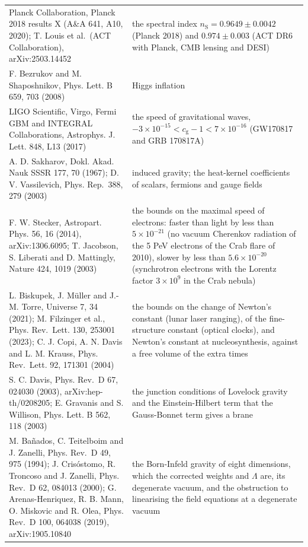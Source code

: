 \documentclass[
  10pt,
]{article}
\begin{document}
\begin{longtable}[]{@{}
  >{\raggedright\arraybackslash}p{}
  >{\raggedright\arraybackslash}p{}@{}}
Planck Collaboration, Planck 2018 results X (A\&A 641, A10, 2020); T.
Louis et al.~(ACT Collaboration), arXiv:2503.14452 & the spectral index
\(n_{\mathrm{S}} = 0.9649 \pm 0.0042\) (Planck 2018) and
\(0.974 \pm 0.003\) (ACT DR6 with Planck, CMB lensing and DESI) \\
F. Bezrukov and M. Shaposhnikov, Phys. Lett. B 659, 703 (2008) & Higgs
inflation \\
LIGO Scientific, Virgo, Fermi GBM and INTEGRAL Collaborations,
Astrophys. J. Lett. 848, L13 (2017) & the speed of gravitational waves,
\(-3\times10^{-15} < c_{\mathrm{g}} - 1 < 7\times10^{-16}\) (GW170817
and GRB 170817A) \\
A. D. Sakharov, Dokl. Akad. Nauk SSSR 177, 70 (1967); D. V. Vassilevich,
Phys. Rep.~388, 279 (2003) & induced gravity; the heat-kernel
coefficients of scalars, fermions and gauge fields \\
F. W. Stecker, Astropart. Phys. 56, 16 (2014), arXiv:1306.6095; T.
Jacobson, S. Liberati and D. Mattingly, Nature 424, 1019 (2003) & the
bounds on the maximal speed of electrons: faster than light by less than
\(5\times10^{-21}\) (no vacuum Cherenkov radiation of the 5 PeV
electrons of the Crab flare of 2010), slower by less than
\(5.6\times10^{-20}\) (synchrotron electrons with the Lorentz factor
\(3\times10^9\) in the Crab nebula) \\
L. Biskupek, J. Müller and J.-M. Torre, Universe 7, 34 (2021); M.
Filzinger et al., Phys. Rev.~Lett. 130, 253001 (2023); C. J. Copi, A. N.
Davis and L. M. Krauss, Phys. Rev.~Lett. 92, 171301 (2004) & the bounds
on the change of Newton's constant (lunar laser ranging), of the
fine-structure constant (optical clocks), and Newton's constant at
nucleosynthesis, against a free volume of the extra times \\
S. C. Davis, Phys. Rev.~D 67, 024030 (2003), arXiv:hep-th/0208205; E.
Gravanis and S. Willison, Phys. Lett. B 562, 118 (2003) & the junction
conditions of Lovelock gravity and the Einstein-Hilbert term that the
Gauss-Bonnet term gives a brane \\
M. Bañados, C. Teitelboim and J. Zanelli, Phys. Rev.~D 49, 975 (1994);
J. Crisóstomo, R. Troncoso and J. Zanelli, Phys. Rev.~D 62, 084013
(2000); G. Arenas-Henriquez, R. B. Mann, O. Miskovic and R. Olea, Phys.
Rev.~D 100, 064038 (2019), arXiv:1905.10840 & the Born-Infeld gravity of
eight dimensions, which the corrected weights and \(\Lambda\) are, its
degenerate vacuum, and the obstruction to linearising the field
equations at a degenerate vacuum \\

\end{longtable}
\end{document}
